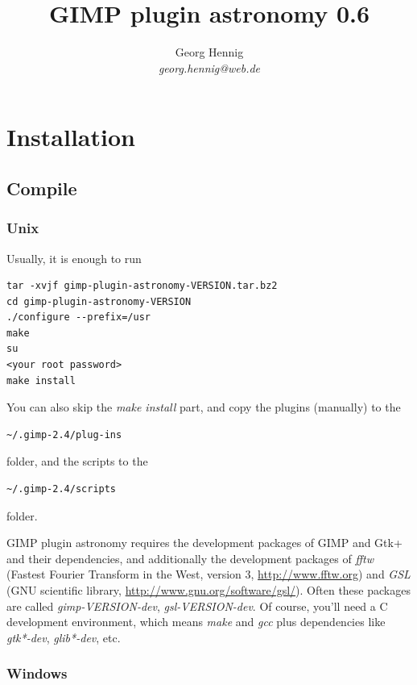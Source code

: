 \documentclass[a4paper]{article}
\title{GIMP plugin astronomy 0.6}
\author{Georg Hennig \\ \emph{georg.hennig@web.de}}
\begin{document}
\maketitle

\newpage

\tableofcontents

\newpage

\section{Installation}

\subsection{Compile}

\subsubsection{Unix}

Usually, it is enough to run
\begin{verbatim}
tar -xvjf gimp-plugin-astronomy-VERSION.tar.bz2
cd gimp-plugin-astronomy-VERSION
./configure --prefix=/usr
make
su
<your root password>
make install
\end{verbatim}

You can also skip the \emph{make install} part, and copy the plugins (manually) to the
\begin{verbatim}~/.gimp-2.4/plug-ins\end{verbatim}
folder, and the scripts to the
\begin{verbatim}~/.gimp-2.4/scripts\end{verbatim}
folder.

GIMP plugin astronomy requires the development packages of GIMP and Gtk+ and their dependencies,
and additionally the development packages of \emph{fftw} (Fastest Fourier Transform in the West, version 3, \url{http://www.fftw.org}) and \emph{GSL} (GNU scientific library, \url{http://www.gnu.org/software/gsl/}).
Often these packages are called \emph{gimp-VERSION-dev}, \emph{gsl-VERSION-dev}. Of course, you'll need a C development environment, which means \emph{make} and \emph{gcc} plus dependencies like \emph{gtk*-dev}, \emph{glib*-dev}, etc.

\subsubsection{Windows}
\end{document}
